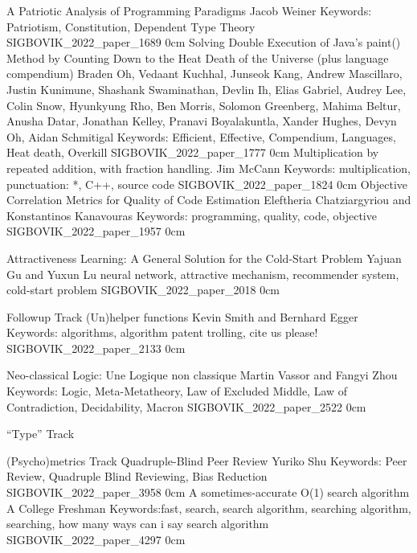 \addpaper
    {A Patriotic Analysis of Programming Paradigms}
    {Jacob Weiner}
    {Keywords: Patriotism, Constitution, Dependent Type Theory}
    {SIGBOVIK_2022_paper_1689}
    {0cm}
    {}
\addpaper
    {Solving Double Execution of Java’s paint() Method by Counting Down to the Heat Death of the Universe (plus language compendium)}
    {Braden Oh, Vedaant Kuchhal, Junseok Kang, Andrew Mascillaro, Justin Kunimune, Shashank Swaminathan, Devlin Ih, Elias Gabriel, Audrey Lee, Colin Snow, Hyunkyung Rho, Ben Morris, Solomon Greenberg, Mahima Beltur, Anusha Datar, Jonathan Kelley, Pranavi Boyalakuntla, Xander Hughes, Devyn Oh, Aidan Schmitigal}
    {Keywords: Efficient, Effective, Compendium, Languages, Heat death, Overkill}
    {SIGBOVIK_2022_paper_1777}
    {0cm}
    {}
\addpaper
    {Multiplication by repeated addition, with fraction handling.}
    {Jim McCann}
    {Keywords: multiplication, punctuation: *, C++, source code}
    {SIGBOVIK_2022_paper_1824}
    {0cm}
    {}
\addpaper
    {Objective Correlation Metrics for Quality of Code Estimation}
    {Eleftheria Chatziargyriou and Konstantinos Kanavouras}
    {Keywords: programming, quality, code, objective}
    {SIGBOVIK_2022_paper_1957}
    {0cm}
    {}


\addpaper
    {Attractiveness Learning: A General Solution for the Cold-Start Problem}
    {Yajuan Gu and Yuxun Lu}
    {neural network, attractive mechanism, recommender system, cold-start problem}
    {SIGBOVIK_2022_paper_2018}
    {0cm}
    {}

\addtrack
    {}{Followup Track}
\addpaper
    {(Un)helper functions}
    {Kevin Smith and Bernhard Egger}
    {Keywords: algorithms, algorithm patent trolling, cite us please!}
    {SIGBOVIK_2022_paper_2133}
    {0cm}
    {}

\addpaper
    {Neo-classical Logic: Une Logique non classique}
    {Martin Vassor and Fangyi Zhou}
    {Keywords: Logic, Meta-Metatheory, Law of Excluded Middle, Law of Contradiction, Decidability, Macron}
    {SIGBOVIK_2022_paper_2522}
    {0cm}
    {}

\addtrack
    {}{``Type'' Track}

\addtrack
    {}{(Psycho)metrics Track}
\addpaper
    {Quadruple-Blind Peer Review}
    {Yuriko Shu}
    {Keywords: Peer Review, Quadruple Blind Reviewing, Bias Reduction}
    {SIGBOVIK_2022_paper_3958}
    {0cm}
    {}
\addpaper
    {A sometimes-accurate O(1) search algorithm}
    {A College Freshman}
    {Keywords:fast, search, search algorithm, searching algorithm, searching, how many ways can i say search algorithm}
    {SIGBOVIK_2022_paper_4297}
    {0cm}
    {}


